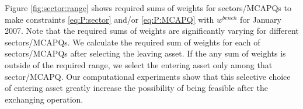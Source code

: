 \documentclass[11pt]{article}
\begin{document}
	Figure \ref{fig:sector:range} shows required sums of weights for sectors/MCAPQs to make constraints \eqref{eq:P:sector} and/or \eqref{eq:P:MCAPQ} with $w^{bench}$ for January 2007. Note that the required sums of weights are significantly varying for different sectors/MCAPQs. We calculate the required sum of weights for each of sectors/MCAPQs after selecting the leaving asset. If the any sum of weights is outside of the required range, we select the entering asset only among that sector/MCAPQ. Our computational experiments show that this selective choice of entering asset greatly increase the possibility of being feasible after the exchanging operation.
	
	
	
	
	
	
\end{document}
